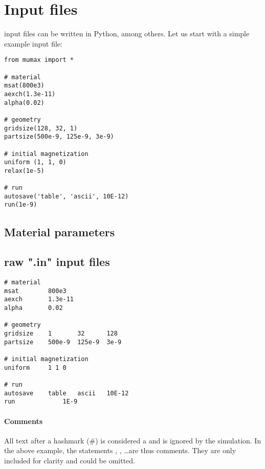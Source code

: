 \section{Input files}


\mumax input files can be written in Python, among others. Let us start with a simple example input file: 

\begin{verbatim}
from mumax import *

# material
msat(800e3)
aexch(1.3e-11)
alpha(0.02)

# geometry 
gridsize(128, 32, 1)
partsize(500e-9, 125e-9, 3e-9)

# initial magnetization
uniform	(1, 1, 0)
relax(1e-5)

# run
autosave('table', 'ascii', 10E-12)
run(1e-9)
\end{verbatim}


\subsection{Material parameters}



\subsection{raw ".in" input files}


\begin{verbatim}
# material
msat       	800e3 
aexch      	1.3e-11
alpha      	0.02

# geometry 
gridsize	1     	32      128    
partsize	500e-9	125e-9 	3e-9

# initial magnetization
uniform		1 1 0

# run
autosave	table	ascii	10E-12
run          	1E-9
\end{verbatim}

\newcommand{\defcommand}[2][\space]{\textbf{#2}\index{#2}\label{#2} \textit{#1}}
\newcommand{\command}[1]{\hyperref[#1]{\textbf{#1}}\index{#1}\label{#1}}

\paragraph{Comments} All text after a hashmark (\#) is considered a  and is ignored by the simulation. In the above example, the statements , , \ldots are thus comments. They are only included for clarity and could be omitted.

